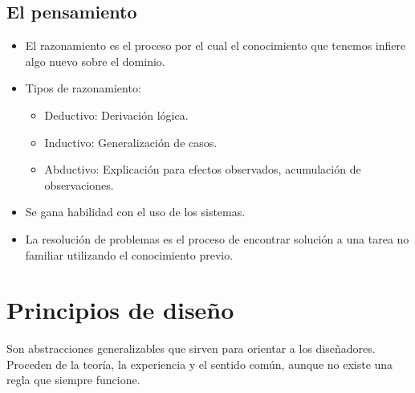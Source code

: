 \documentclass[12pt, twoside, openright]{report} %
\begin{document}
\subsection{El pensamiento}

\begin{itemize}
	\item El razonamiento es el proceso por el cual el conocimiento que
	      tenemos infiere algo nuevo sobre el dominio.
	\item Tipos de razonamiento:

	      \begin{itemize}
		      \item Deductivo: Derivación lógica.

		      \item Inductivo: Generalización de casos.

		      \item Abductivo: Explicación para efectos observados, acumulación de
		            observaciones.
	      \end{itemize}
	\item Se gana habilidad con el uso de los sistemas.
	\item La resolución de problemas es el proceso de encontrar solución a
	      una tarea no familiar utilizando el conocimiento previo.
\end{itemize}


\section{Principios de diseño}

Son abstracciones generalizables que sirven para orientar a los
diseñadores. Proceden de la teoría, la experiencia y el sentido común,
aunque no existe una regla que siempre funcione.
\end{document}
